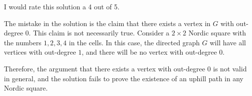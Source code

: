 I would rate this solution a 4 out of 5.

The mistake in the solution is the claim that there exists a vertex in $G$ with out-degree $0$. This claim is not necessarily true. Consider a $2 \times 2$ Nordic square with the numbers $1, 2, 3, 4$ in the cells. In this case, the directed graph $G$ will have all vertices with out-degree $1$, and there will be no vertex with out-degree $0$. 

Therefore, the argument that there exists a vertex with out-degree $0$ is not valid in general, and the solution fails to prove the existence of an uphill path in any Nordic square.

